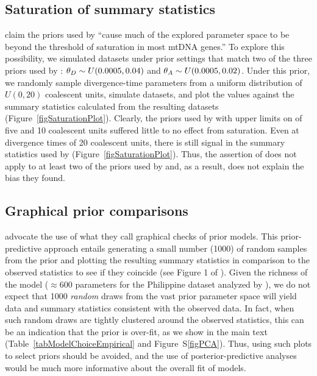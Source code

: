 \subsection*{Saturation of summary statistics}
\citet{Hickerson2013} claim the priors used by \citet{Oaks2012} ``cause much of
the explored parameter space to be beyond the threshold of saturation in most
mtDNA genes.'' To explore this possibility, we simulated datasets under prior
settings that match two of the three priors used by \citet{Oaks2012}:
$\meanDescendantTheta{} \sim U(0.0005, 0.04)$ and $\ancestralTheta{} \sim
U(0.0005, 0.02)$.
Under this prior, we randomly sample divergence-time parameters from a uniform
distribution of $U(0, 20)$ coalescent units, simulate datasets, and plot the
\divt{} values against the summary statistics calculated from the resulting
datasets (Figure~\ref{figSaturationPlot}).
Clearly, the priors used by \citet{Oaks2012} with upper limits on \divt{} of five
and 10 coalescent units suffered little to no effect from saturation.
Even at divergence times of 20 coalescent units, there is still signal in the
summary statistics used by \msb (Figure~\ref{figSaturationPlot}).
Thus, the assertion of \citet{Hickerson2013} does not apply to at least
two of the priors used by \citet{Oaks2012} and, as a result, does not
explain the bias they found.

\subsection*{Graphical prior comparisons}
\citet{Hickerson2013} advocate the use of what they call graphical checks of
prior models.
This prior-predictive approach entails generating a small number (1000) of
random samples from the prior and plotting the resulting summary statistics in
comparison to the observed statistics to see if they coincide (see Figure 1 of
\citet{Hickerson2013}).
Given the richness of the \msb model ($\approx 600$ parameters for the Philippine
dataset analyzed by \citet{Hickerson2013}), we do not expect that 1000
\emph{random} draws from the vast prior parameter space will yield data and
summary statistics consistent with the observed data.
In fact, when such random draws are tightly clustered around the observed
statistics, this can be an indication that the prior is over-fit, as we show in
the main text (Table~\ref{tabModelChoiceEmpirical} and Figure~S\ref{figPCA}).
Thus, using such plots to select priors should be avoided, and the use of
posterior-predictive analyses would be much more informative about the overall
fit of models.

